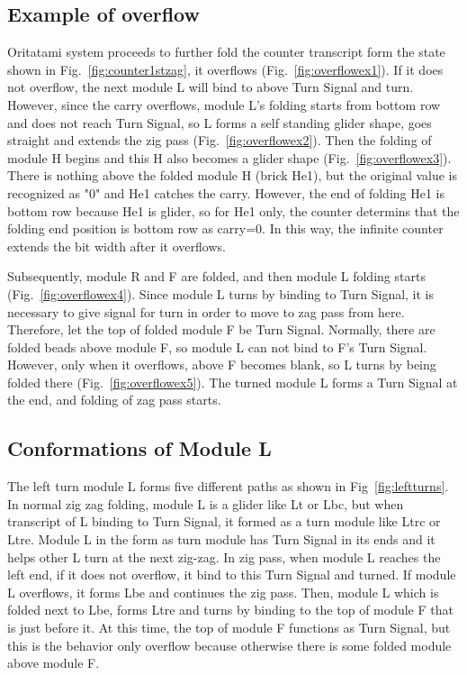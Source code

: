 \documentclass[runningheads]{llncs}
\begin{document}
\subsection{Example of overflow}
Oritatami system proceeds to further fold the counter transcript form the state shown in Fig.~\ref{fig:counter1stzag}, it overflows (Fig.~\ref{fig:overflowex1}).
If it does not overflow, the next module L will bind to above Turn Signal and turn.
However, since the carry overflows, module L's folding starts from bottom row and does not reach Turn Signal, so L forms a self standing glider shape, goes straight and extends the zig pass (Fig.~\ref{fig:overflowex2}).
Then the folding of module H begins and this H also becomes a glider shape (Fig.~\ref{fig:overflowex3}).
There is nothing above the folded module H (brick He1), but the original value is recognized as "0" and He1 catches the carry.
However, the end of folding He1 is bottom row because He1 is glider, so for He1 only, the counter determins that the folding end position is bottom row as carry=0.
In this way, the infinite counter extends the bit width after it overflows.

Subsequently, module R and F are folded, and then module L folding starts (Fig.~\ref{fig:overflowex4}).
Since module L turns by binding to Turn Signal, it is necessary to give signal for turn in order to move to zag pass from here.
Therefore, let the top of folded module F be Turn Signal.
Normally, there are folded beads above module F, so module L can not bind to F's Turn Signal.
However, only when it overflows, above F becomes blank, so L turns by being folded there (Fig.~\ref{fig:overflowex5}).
The turned module L forms a Turn Signal at the end, and folding of zag pass starts.


\subsection{Conformations of Module L}
The left turn module L forms five different paths as shown in Fig~\ref{fig:leftturns}.
In normal zig zag folding, module L is a glider like Lt or Lbc, but when transcript of L binding to Turn Signal, it formed as a turn module like Ltrc or Ltre.
Module L in the form as turn module has Turn Signal in its ends and it helps other L turn at the next zig-zag.
In zig pass, when module L reaches the left end, if it does not overflow, it bind to this Turn Signal and turned.
If module L overflows, it forms Lbe and continues the zig pass.
Then, module L which is folded next to Lbe, forms Ltre and turns by binding to the top of module F that is just before it.
At this time, the top of module F functions as Turn Signal, but this is the behavior only overflow because otherwise there is some folded module above module F.
\end{document}
